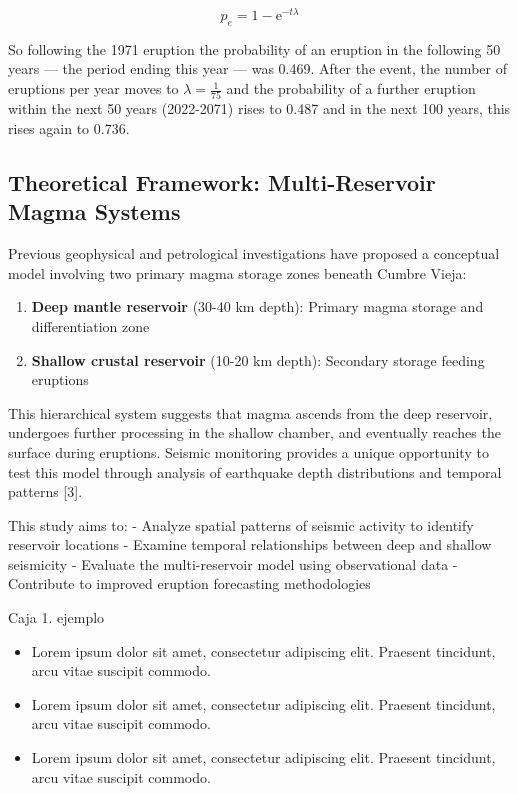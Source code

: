 \documentclass[
  letterpaper,
]{book}
\providecommand{\tightlist}{%
  \setlength{\itemsep}{0pt}\setlength{\parskip}{0pt}}
\begin{document}
\[
p_e = 1-\mathrm{e}^{-t \lambda}
\]

So following the 1971 eruption the probability of an eruption in the
following 50 years --- the period ending this year --- was 0.469. After
the event, the number of eruptions per year moves to
\(\lambda=\frac{1}{75}\) and the probability of a further eruption
within the next 50 years (2022-2071) rises to 0.487 and in the next 100
years, this rises again to 0.736.

\subsection{Theoretical Framework: Multi-Reservoir Magma
Systems}\label{theoretical-framework-multi-reservoir-magma-systems}

Previous geophysical and petrological investigations have proposed a
conceptual model involving two primary magma storage zones beneath
Cumbre Vieja:

\begin{enumerate}
\def\labelenumi{\arabic{enumi}.}
\tightlist
\item
  \textbf{Deep mantle reservoir} (30-40 km depth): Primary magma storage
  and differentiation zone
\item
  \textbf{Shallow crustal reservoir} (10-20 km depth): Secondary storage
  feeding eruptions
\end{enumerate}

This hierarchical system suggests that magma ascends from the deep
reservoir, undergoes further processing in the shallow chamber, and
eventually reaches the surface during eruptions. Seismic monitoring
provides a unique opportunity to test this model through analysis of
earthquake depth distributions and temporal patterns {[}3{]}.

This study aims to: - Analyze spatial patterns of seismic activity to
identify reservoir locations - Examine temporal relationships between
deep and shallow seismicity - Evaluate the multi-reservoir model using
observational data - Contribute to improved eruption forecasting
methodologies

\begin{tcolorbox}[enhanced jigsaw, toprule=.15mm, breakable, colframe=quarto-callout-important-color-frame, opacityback=0, arc=.35mm, rightrule=.15mm, left=2mm, leftrule=.75mm, bottomrule=.15mm, colback=white]

Caja 1. ejemplo

\begin{itemize}
\tightlist
\item
  Lorem ipsum dolor sit amet, consectetur adipiscing elit. Praesent
  tincidunt, arcu vitae suscipit commodo.
\item
  Lorem ipsum dolor sit amet, consectetur adipiscing elit. Praesent
  tincidunt, arcu vitae suscipit commodo.
\item
  Lorem ipsum dolor sit amet, consectetur adipiscing elit. Praesent
  tincidunt, arcu vitae suscipit commodo.
\end{itemize}

\end{tcolorbox}
\end{document}

